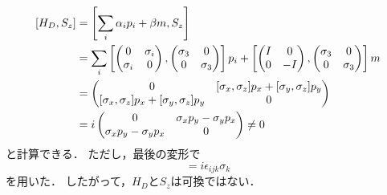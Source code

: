 \begin{align}
  \left[H_D, S_z\right] &= \left[\sum_i \alpha_i p_i + \beta m, S_z\right] \notag\\
  &= \sum_i \left[
    \begin{pmatrix}
      0 & \sigma_i \\
      \sigma_i & 0 \\
    \end{pmatrix}  
    ,
    \begin{pmatrix}
      \sigma_3 & 0 \\
      0 & \sigma_3 \\
    \end{pmatrix}
  \right]
  p_i +  \left[
    \begin{pmatrix}
      I & 0 \\
      0 & -I \\
    \end{pmatrix}
    ,
    \begin{pmatrix}
      \sigma_3 & 0 \\
      0 & \sigma_3 \\
    \end{pmatrix}
  \right]
  m \notag \\
  &= 
  \begin{pmatrix}
    0 & [\sigma_x,\sigma_z]p_x + [\sigma_y, \sigma_z]p_y \\
    [\sigma_x,\sigma_z]p_x + [\sigma_y, \sigma_z]p_y & 0 \\
  \end{pmatrix} \notag\\
  &= i 
  \begin{pmatrix}
    0 & \sigma_x p_y -\sigma_y p_x\\
    \sigma_x p_y -\sigma_y p_x & 0 \\
  \end{pmatrix} \neq 0
\end{align}
と計算できる．
ただし，最後の変形で
\begin{equation}
  [\sigma_i, \sigma_j] = i\epsilon_{ijk}\sigma_k
\end{equation}
を用いた．
したがって，$H_D$と$S_z$は可換ではない．

